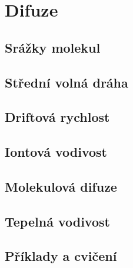 \chapter{Difuze}\label{fyz:IchapXLIII}
\minitoc
  \section{Srážky molekul}\label{fyz:IchapXLIIIsecI}
  \section{Střední volná dráha}\label{fyz:IchapXLIIIsecII}
  \section{Driftová rychlost}\label{fyz:IchapXLIIIsecIII}
  \section{Iontová vodivost}\label{fyz:IchapXLIIIsecIV}
  \section{Molekulová difuze}\label{fyz:IchapXLIIIsecV}
  \section{Tepelná vodivost}\label{fyz:IchapXLIIIsecVI}
  \section{Příklady a cvičení}\label{fyz:IchapXLIIIsecVII}